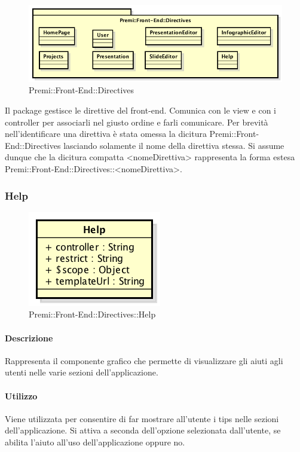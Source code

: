 \begin{figure}[h]
	\centering
	\includegraphics[width=0.7\linewidth]{img/premi_front_end_directives}
	\caption[Premi::Front-End::Directives]{Premi::Front-End::Directives}
\end{figure}
Il package gestisce le direttive del \gls{front-end}. Comunica con le view e con i controller per associarli nel giusto ordine e farli comunicare.
Per brevità nell'identificare una direttiva è stata omessa la dicitura Premi::\gls{Front-End}::Directives lasciando solamente il nome della direttiva stessa. Si assume dunque che la dicitura compatta <nomeDirettiva> rappresenta la forma estesa Premi::\gls{Front-End}::Directives::<nomeDirettiva>.
\newpage


\subsubsection{Help}
	\begin{figure}[h]
		\centering
		\includegraphics[width=0.4\linewidth]{img/premi_front_end_directives_help}
		\caption[Premi::Front-End::Directives::Help]{Premi::Front-End::Directives::Help}
	\end{figure}
	
	\paragraph{Descrizione}
	Rappresenta il componente grafico che permette di visualizzare gli aiuti agli utenti nelle varie sezioni dell'applicazione.
	
	\paragraph{Utilizzo}
	Viene utilizzata per consentire di far mostrare all'utente i tips nelle sezioni dell'applicazione. Si attiva a seconda dell'opzione selezionata dall'utente, se abilita l'aiuto all'uso dell'applicazione oppure no.
	
